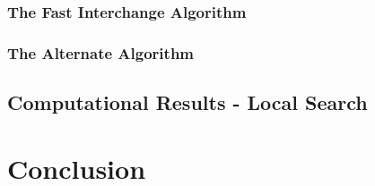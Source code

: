 \documentclass[11pt]{article}
\newcommand{\np}{\newpage}
\begin{document}
	
	\subsubsection{The Fast Interchange Algorithm}
	
	
	\subsubsection{The Alternate Algorithm}
	
	
	\subsection{Computational Results - Local Search}
	
	
	
	\section{Conclusion}
		
		
	\np
	
	
	\np

	\printindex[terms]
	\printindex[authors]
	
\end{document}
